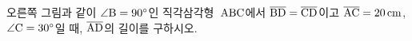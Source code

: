 \noindent\begin{minipage}[t]{0.58\linewidth}\vspace{0pt}\raggedright 오른쪽 그림과 같이 $\angle\mathrm{B}=90^\circ$인 직각삼각형~$\mathrm{ABC}$에서 $\overline{\mathrm{BD}}=\overline{\mathrm{CD}}$이고 $\overline{\mathrm{AC}}=20\,\mathrm{cm}$, $\angle\mathrm{C}=30^\circ$일 때, $\overline{\mathrm{AD}}$의 길이를 구하시오.\end{minipage}\hfill\begin{minipage}[t]{0.4\linewidth}\vspace{0pt}\centering \resizebox{\ifdim\width>\linewidth\linewidth\else\width\fi}{!}{}\end{minipage}\par
